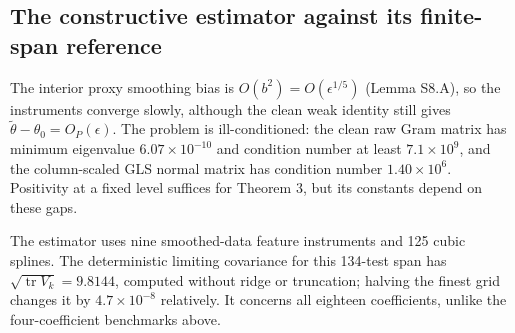 \documentclass[ejs]{imsart}
\begin{document}
\subsection{The constructive estimator against its finite-span
reference}\label{the-constructive-estimator-against-its-finite-span-reference}

The interior proxy smoothing bias is \(O(b^2)=O(\epsilon^{1/5})\) (Lemma
S8.A), so the instruments converge slowly, although the clean weak
identity still gives \(\widetilde\theta-\theta_0=O_P(\epsilon)\). The
problem is ill-conditioned: the clean raw Gram matrix has minimum
eigenvalue \(6.07\times10^{-10}\) and condition number at least
\(7.1\times10^9\), and the column-scaled GLS normal matrix has condition
number \(1.40\times10^6\). Positivity at a fixed level suffices for
Theorem 3, but its constants depend on these gaps.

The estimator uses nine smoothed-data feature instruments and 125 cubic
splines. The deterministic limiting covariance for this 134-test span
has \(\sqrt{\operatorname{tr}V_k}=9.8144\), computed without ridge or
truncation; halving the finest grid changes it by \(4.7\times10^{-8}\)
relatively. It concerns all eighteen coefficients, unlike the
four-coefficient benchmarks above.
\end{document}
